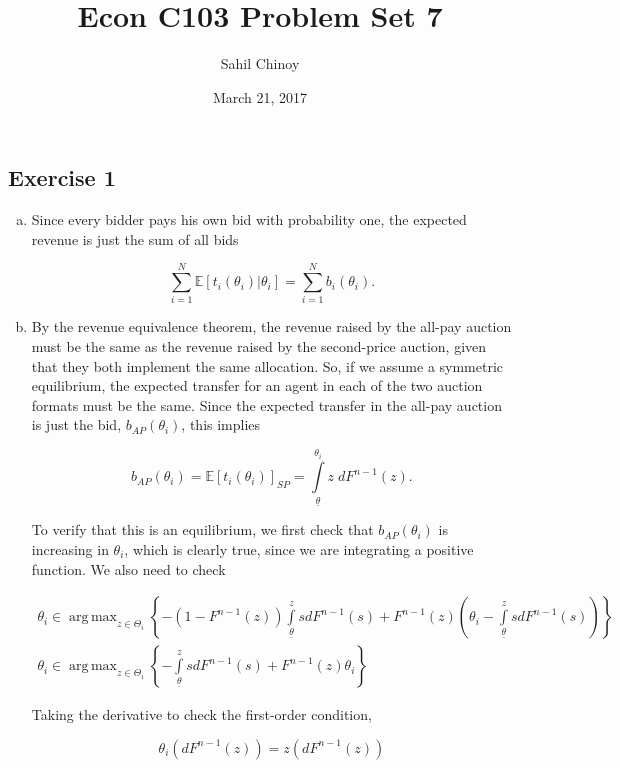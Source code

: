\documentclass{article}
\title{Econ C103 Problem Set 7}
\author{Sahil Chinoy}
\date{March 21, 2017}
\DeclareMathOperator*{\argmax}{arg\,max}
\begin{document}
\maketitle{}

\subsection*{Exercise 1}

\begin{enumerate}[(a)]
	\item

	Since every bidder pays his own bid with probability one, the expected revenue is just the sum of all bids

	$$\sum \limits_{i=1}^N \mathbb{E}[t_i(\theta_i) | \theta_i] = \sum \limits_{i=1}^{N} b_i(\theta_i).$$

	\item

	By the revenue equivalence theorem, the revenue raised by the all-pay auction must be the same as the revenue raised by the second-price auction, given that they both implement the same allocation. So, if we assume a symmetric equilibrium, the expected transfer for an agent in each of the two auction formats must be the same. Since the expected transfer in the all-pay auction is just the bid, $b_{AP}(\theta_i)$, this implies

	$$b_{AP}(\theta_i) = \mathbb{E}[t_i(\theta_i)]_{SP} = \int \limits_{\underline{\theta}}^{\theta_i} z \; dF^{n-1}(z).$$

	To verify that this is an equilibrium, we first check that $b_{AP}(\theta_i)$ is increasing in $\theta_i$, which is clearly true, since we are integrating a positive function. We also need to check

	\begin{gather*}
	\theta_i \in \argmax_{z \in \Theta_i} \left\{ -(1 - F^{n-1}(z))\int \limits_{\underline{\theta}}^z s dF^{n-1}(s) + F^{n-1}(z) \left(\theta_i - \int \limits_{\underline{\theta}}^z s dF^{n-1}(s) \right) \right\} \\
	\theta_i \in \argmax_{z \in \Theta_i} \left\{ -\int \limits_{\underline{\theta}}^z s dF^{n-1}(s) + F^{n-1}(z) \theta_i  \right\}
	\end{gather*}

	Taking the derivative to check the first-order condition,

	\begin{equation*}
	\theta_i (dF^{n-1}(z)) = z (dF^{n-1}(z))
	\end{equation*}


\end{enumerate}
\end{document}
